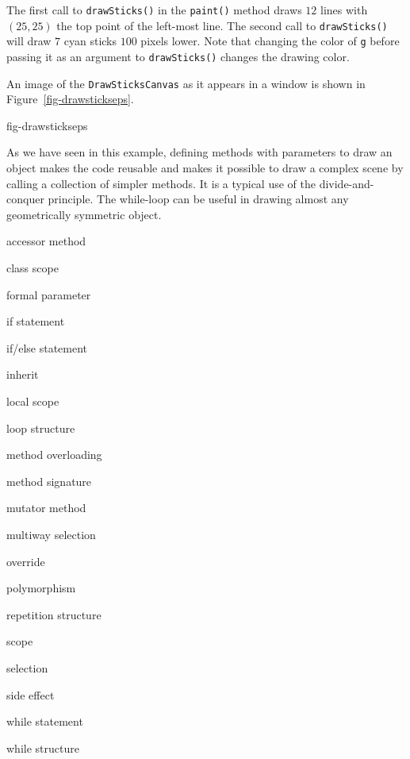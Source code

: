 The first call to {\tt drawSticks()} in the {\tt paint()} method draws $12$
lines with $(25,25)$ the top point of the left-most line.  The second call to
{\tt drawSticks()} will draw $7$ cyan sticks $100$ pixels lower.  Note that 
changing the color of {\tt g} before passing it as an argument to 
{\tt drawSticks()} changes the drawing color.


\noindent An image of the {\tt DrawSticksCanvas} as it appears in a window
is shown in Figure~\ref{fig-drawstickseps}.

{fig-drawstickseps}

As we have seen in this example, defining methods with parameters to
draw an object makes the code reusable and makes it possible to draw a
complex scene by calling a collection of simpler methods.  It is a
typical use of the divide-and-conquer principle.  The while-loop can
be useful in drawing almost any geometrically symmetric object.


\label{chapter-summary}
\label{technical-terms}
\begin{KT}
accessor method

class scope

formal parameter

if statement

if/else statement

inherit

local scope

loop structure

method overloading

method signature

mutator method

multiway selection

override

polymorphism

repetition structure

scope

selection

side effect 

while statement

while structure
\end{KT}

